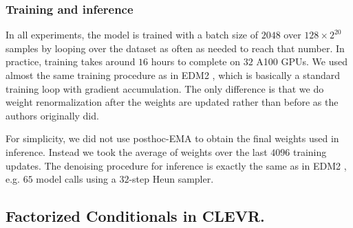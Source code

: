 \subsubsection{Training and inference}
In all experiments, the model is trained with a batch size of $2048$ over $128\times2^{20}$ samples by looping over the dataset as often as needed to reach that number.
In practice, training takes around $16$ hours to complete on $32$ A100 GPUs.
We used almost the same training procedure as in EDM2 \cite{karras2024analyzing}, which is basically a standard training loop with gradient accumulation.
The only difference is that we do weight renormalization after the weights are updated rather than before as the authors originally did.

For simplicity, we did not use posthoc-EMA to obtain the final weights used in inference.
Instead we took the average of weights over the last $4096$ training updates.
The denoising procedure for inference is exactly the same as in EDM2 \cite{karras2024analyzing}, e.g. $65$ model calls using a $32$-step Heun sampler.

\subsection{Factorized Conditionals in CLEVR.}
\label{app:clevr-details}

